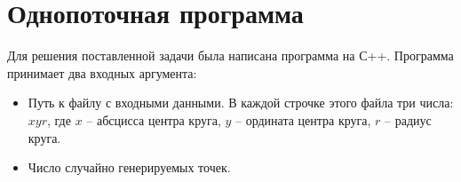 \section{Однопоточная программа}

Для решения поставленной задачи была написана программа на С++. Программа принимает два входных аргумента:
\begin{itemize}
\item Путь к файлу с входными данными. В каждой строчке этого файла три числа: $x y r$, где $x$ -- абсцисса центра круга, $y$ -- ордината центра круга, $r$ -- радиус круга.
\item Число случайно генерируемых точек. 
\end{itemize}

